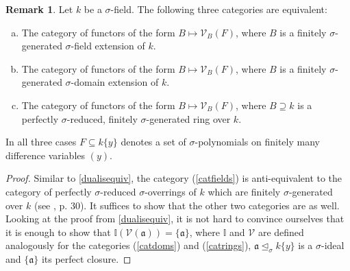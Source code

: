 \documentclass{article}
\def\I{\mathbb{I}}
\def\V{\mathcal{V}}
\def\a{\mathfrak{a}}
\def\s{\sigma}
\def\si{\unlhd_{\sigma}}
\newenvironment{bew}{\begin{proof}[Proof]}{\end{proof}}
\theoremstyle{plain}
\theoremstyle{definition}
\newtheorem{rem}[Satz]{Remark}
\begin{document}
\begin{rem}
Let $k$ be a $\s$-field. The following three categories are equivalent:
\begin{enumerate}[(a)]
\item  The category of functors of the form $B \mapsto \V_B(F)$, where $B$ is a finitely $\s$-generated $\s$-field extension of $k$. \label{catfields}
\item \label{catdoms} The category of functors of the form $B \mapsto \V_B(F)$, where $B$ is a finitely $\s$-generated $\s$-domain extension of $k$.
\item \label{catrings} The category of functors of the form $B \mapsto \V_B(F)$, where $B \supseteq k$ is a perfectly $\s$-reduced, finitely $\s$-generated ring over $k$.
\end{enumerate}
In all three cases $F \subseteq k\{y\}$ denotes a set of $\s$-polynomials on finitely many difference variables $(y)$.
\begin{bew}
Similar to \ref{dualisequiv}, the category (\ref{catfields}) is anti-equivalent to the category of perfectly $\s$-reduced $\s$-overrings of $k$ which are finitely $\s$-generated over $k$ (see \cite{wibmer}, p. 30).
It suffices to show that the other two categories are as well. Looking at the proof from \ref{dualisequiv}, it is not hard to convince ourselves that it is enough to show that $\I(\V(\a)) = \{\a\}$,
where $\I$ and $\V$ are defined analogously for the categories (\ref{catdoms}) and (\ref{catrings}), $\a \si k\{y\}$ is a $\s$-ideal and $\{ \a \}$ its perfect closure. 


\end{bew}
\end{rem}
\end{document}
